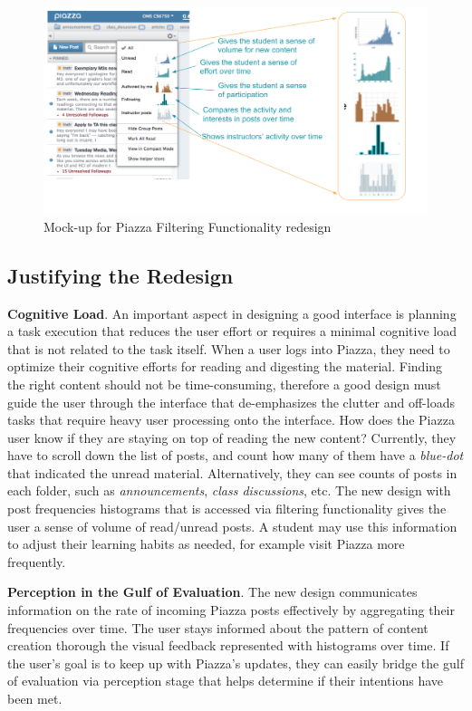\documentclass[12pt,letterpaper]{article}
\begin{document}
\begin{figure}[h]
\centering
\includegraphics[scale=.4]{figures/p5/piazza_filtering.png}
\caption{Mock-up for Piazza Filtering Functionality redesign}
\label{fig::1}
\end{figure}

\subsection*{Justifying the Redesign}

\textbf{Cognitive Load}. An important aspect in designing a good interface is planning a task execution that reduces the user effort or requires a minimal cognitive load that is not related to the task itself. When a user logs into Piazza, they need to optimize their cognitive efforts for reading and digesting the material. Finding the right content should not be time-consuming, therefore a good design must guide the user through the interface that de-emphasizes the clutter and off-loads tasks that require heavy user processing onto the interface. How does the Piazza user know if they are staying on top of reading the new content? Currently, they have to scroll down the list of posts, and count how many of them have a \textit{blue-dot} that indicated the unread material. Alternatively, they can see counts of posts in each folder, such as \textit{announcements}, \textit{class discussions}, etc. The new design with post frequencies histograms that is accessed via filtering functionality gives the user a sense of volume of read/unread posts. A student may use this information to adjust their learning habits as needed, for example visit Piazza more frequently.     

\textbf{Perception in the Gulf of Evaluation}. The new design communicates information on the rate of incoming Piazza posts effectively by aggregating their frequencies over time. The user stays informed about the pattern of content creation thorough the visual feedback represented with histograms over time. If the user's goal is to keep up with Piazza's updates, they can easily bridge the gulf of evaluation via perception stage that helps determine if their intentions have been met.
\end{document}
